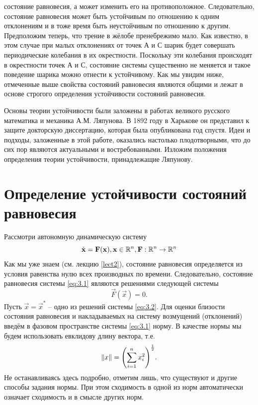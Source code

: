состояние равновесия, а может изменить его на противоположное.
Следовательно, состояние равновесия может быть устойчивым по отношению к
одним отклонениям и в тоже время быть неустойчивым по отношению к
другим. Предположим теперь, что трение в жёлобе пренебрежимо мало. Как
известно, в этом случае при малых отклонениях от точек А и С шарик будет
совершать периодические колебания в их окрестности. Поскольку эти
колебания происходят в окрестности точек А и С, состояние системы
существенно не меняется и такое поведение шарика можно отнести к
устойчивому. Как мы увидим ниже, отмеченные выше свойства состояний
равновесия являются общими и лежат в основе строгого определения
устойчивости состояний равновесия.

Основы теории устойчивости были заложены в работах великого
русского математика и механика А.М. Ляпунова. В 1892 году в Харькове он
представил к защите докторскую диссертацию, которая была опубликована год
спустя. Идеи и подходы, заложенные в этой работе, оказались настолько
плодотворными, что до сих пор являются актуальными и востребованными.
Изложим положения определения теории устойчивости, принадлежащие
Ляпунову.

\section{Определение устойчивости состояний равновесия}%


Рассмотри автономную динамическую систему
\begin{equation}
    \label{eq:3.1}
    \dot {\mathbf{x}} =  \mathbf{F}(\mathbf{x}), \mathbf{x} \in \mathbb{R}^n,   \mathbf{F}: \mathbb{R}^n \rightarrow \mathbb{R}^n
\end{equation}
Как мы уже знаем (см. лекцию \ref{lect2}), состояние равновесия определяется из условия равенства нулю всех производных по времени. Следовательно, состояние равновесия системы \eqref{eq:3.1} являются решениями следующей системы
\begin{equation}
    \label{eq:3.2}
    \vec F(\vec x) = 0 . 
\end{equation}
Пусть $\vec x= \vec x^*$ -- одно из решений системы \eqref{eq:3.2}. Для оценки близости состояния равновесия и накладываемых на систему возмущений (отклонений) введём в фазовом пространстве системы    \eqref{eq:3.1} норму. В качестве нормы мы будем использовать евклидову длину вектора, т.е.
\begin{equation}
    \label{eq:}
    \norm {x}=\qty( \sum\limits_{i=1}^n x_i^2) ^{\frac12}.
\end{equation}
Не останавливаясь здесь подробно, отметим лишь, что существуют и другие способы задания нормы. При этом сходимость в одной из норм автоматически означает сходимость и в смысле других норм.

